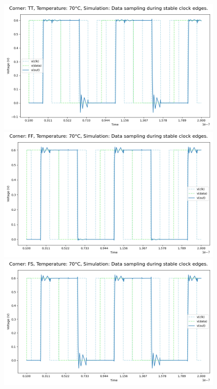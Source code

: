 \begin{figure}[H]
    \centering
    \includegraphics[height= 0.21\textheight]{figures/aimspice/TT70W2.png}
    \vspace{5pt}
    \includegraphics[height= 0.21\textheight]{figures/aimspice/FF70W2.png}
    \vspace{5pt}
    \includegraphics[height= 0.21\textheight]{figures/aimspice/FS70W2.png}

\end{figure}
